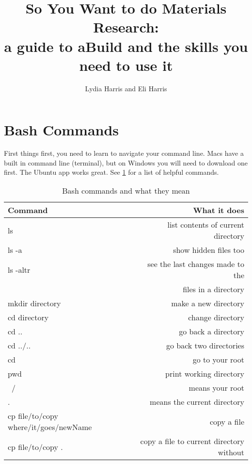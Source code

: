 \documentclass{article}
\title{So You Want to do Materials Research:\\[0.02em]\smaller{}a
guide to aBuild and the skills you need to use it}
\author{Lydia Harris and Eli Harris}
\begin{document}
\maketitle

\section{Bash Commands}

First things first, you need to learn to navigate your command
line. Macs have a built in command line (terminal), but on Windows you will need
to download one first. The Ubuntu app works great. See
\ref{bashcommands} for a list of helpful commands. 

\begin{table}
        \begin{center}
                \caption{Bash commands and what they mean}
                \label{bashcommands}
                \begin{tabular}{l|r}
                        \textbf{Command} & \textbf{What it does}\\
                        \hline
                        ls & list contents of current directory \\
                        ls -a & show hidden files too \\
                        ls -altr & see the last changes made to the \\
                         & files in a directory \\
                        mkdir directory & make a new directory \\
                        cd directory & change directory \\
                        cd .. & go back a directory \\
                        cd ../.. & go back two directories \\
                        cd ~ & go to your root \\
                        pwd & print working directory \\
                        ~/ & means your root \\
                        . & means the current directory \\
                        cp file/to/copy where/it/goes/newName & copy
                        a file \\
                        cp file/to/copy . & copy a file to current
                        directory without \\

\end{tabular}
\end{center}
\end{table}
\end{document}
